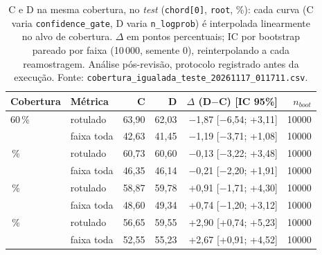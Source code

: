 \begin{table}[t]
  \centering
  \caption{C e D na mesma cobertura, no \emph{test} (\texttt{chord[0]}, \texttt{root}, \%): cada curva (C varia \texttt{confidence\_gate}, D varia \texttt{n\_logprob}) é interpolada linearmente no alvo de cobertura. $\Delta$ em pontos percentuais; IC por bootstrap pareado por faixa (10\,000, semente 0), reinterpolando a cada reamostragem. Análise pós-revisão, protocolo registrado antes da execução. Fonte: \texttt{cobertura\_igualada\_teste\_20261117\_011711.csv}.}
  \label{tab:cobertura_igualada}
  \footnotesize
  \begin{tabular}{llrrrr}
    \toprule
    Cobertura & Métrica & C & D & $\Delta$ (D$-$C) [IC 95\%] & $n_{boot}$ \\
    \midrule
    60\,\% & rotulado & 63,90 & 62,03 & $-$1,87 [$-$6,54; +3,11] & 10000 \\
     & faixa toda & 42,63 & 41,45 & $-$1,19 [$-$3,71; +1,08] & 10000 \\
    \addlinespace
    70\,\% & rotulado & 60,73 & 60,60 & $-$0,13 [$-$3,22; +3,48] & 10000 \\
     & faixa toda & 46,35 & 46,14 & $-$0,21 [$-$2,20; +1,91] & 10000 \\
    \addlinespace
    77\,\% & rotulado & 58,87 & 59,78 & +0,91 [$-$1,71; +4,30] & 10000 \\
     & faixa toda & 48,60 & 49,34 & +0,74 [$-$1,20; +3,12] & 10000 \\
    \addlinespace
    90\,\% & rotulado & 56,65 & 59,55 & +2,90 [+0,74; +5,23] & 10000 \\
     & faixa toda & 52,55 & 55,23 & +2,67 [+0,91; +4,52] & 10000 \\
    \bottomrule
  \end{tabular}
\end{table}
